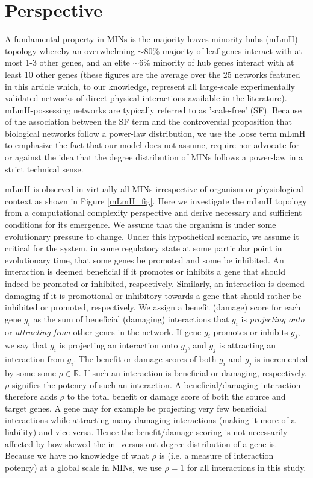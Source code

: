 \documentclass[12pt]{article}
\begin{document}
\section{Perspective}
A fundamental property in MINs is the majority-leaves minority-hubs  (mLmH) topology whereby an overwhelming ${\sim}$80\% majority of leaf genes interact with at most 1-3 other genes, and an elite ${\sim}$6\% minority of hub genes interact with at least 10 other genes (these figures are the average over the 25 networks featured in this article which, to our knowledge, represent all large-scale experimentally validated networks of direct physical interactions available in the literature). mLmH-possessing networks are typically referred to as 'scale-free' (SF). Because of the association between the SF term and the controversial proposition \cite{arita_metabolic_2004, tanaka_protein_2005, fox_keller_revisiting_2005, khanin_how_2006} that biological networks follow a power-law distribution, we use the loose term mLmH to emphasize the fact that our model does not assume, require nor advocate for or against the idea that the degree distribution of MINs follows a power-law in a strict technical sense.

mLmH is observed in virtually all MINs irrespective of organism or physiological context as shown in Figure \ref{mLmH_fig}. Here we investigate the mLmH topology from a computational complexity perspective and derive necessary and sufficient conditions for its emergence. We assume that the organism is under some evolutionary pressure to change. Under this hypothetical scenario, we assume it critical for the system, in some regulatory state at some particular point in evolutionary time,  that some genes be promoted and some be inhibited. An interaction is deemed beneficial if it promotes or inhibits a gene that should indeed be promoted or inhibited, respectively. Similarly, an interaction is deemed  damaging if it is promotional or inhibitory towards a gene that should rather be inhibited or promoted, respectively. We assign a benefit (damage) score for each gene $g_i$ as the sum of beneficial (damaging) interactions that $g_i$ is \textit{projecting onto} or \textit{attracting  from} other genes in the network. If gene $g_i$ promotes or inhibits $g_j$, we say that $g_i$ is projecting an interaction onto $g_j$, and $g_j$ is attracting an interaction from $g_i$. The benefit or damage scores of both $g_i$ and $g_j$ is incremented by some some $\rho\in\mathbb{R}$. If such an interaction is beneficial or damaging, respectively. $\rho$ signifies the potency of such an interaction. A beneficial/damaging interaction therefore adds $\rho$ to the total benefit or damage score of both the source and target genes. A gene may for example be projecting very few beneficial interactions while attracting many damaging interactions (making it more of a liability) and vice versa. Hence the benefit/damage scoring is not necessarily affected by how skewed the in- versus out-degree distribution of a gene is. Because we have no knowledge of what $\rho$ is (i.e. a measure of interaction potency) at a global scale in MINs, we use $\rho=1$ for all interactions in this study.
\end{document}
